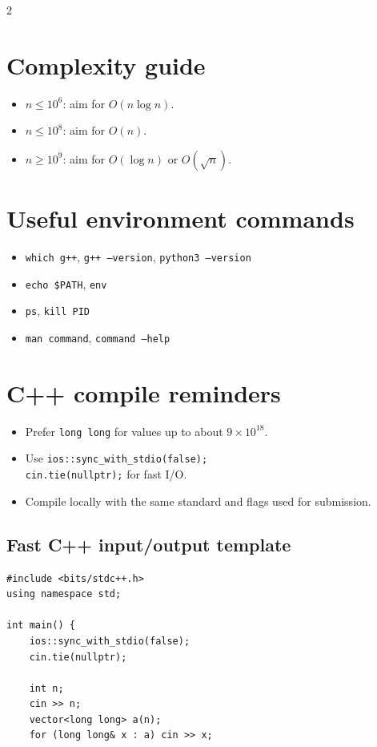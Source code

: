 \documentclass[10pt]{article}
\newcommand{\cmd}[1]{\texttt{\small #1}}
\newcommand{\code}[1]{\texttt{#1}}
\begin{document}
\begin{multicols}{2}
\section{Complexity guide}
\begin{itemize}
  \item $n \le 10^6$: aim for $O(n\log n)$.
  \item $n \le 10^8$: aim for $O(n)$.
  \item $n \ge 10^9$: aim for $O(\log n)$ or $O(\sqrt n)$.
\end{itemize}

\section{Useful environment commands}
\begin{itemize}
  \item \cmd{which g++}, \cmd{g++ --version}, \cmd{python3 --version}
  \item \cmd{echo \$PATH}, \cmd{env}
  \item \cmd{ps}, \cmd{kill PID}
  \item \cmd{man command}, \cmd{command --help}
\end{itemize}

\section{C++ compile reminders}
\begin{itemize}
  \item Prefer \code{long long} for values up to about $9\times10^{18}$.
  \item Use \code{ios::sync\_with\_stdio(false);}\\
        \code{cin.tie(nullptr);} for fast I/O.
  \item Compile locally with the same standard and flags used for submission.
\end{itemize}

\subsection{Fast C++ input/output template}
\begin{framed}
\scriptsize
\begin{verbatim}
#include <bits/stdc++.h>
using namespace std;

int main() {
    ios::sync_with_stdio(false);
    cin.tie(nullptr);

    int n;
    cin >> n;
    vector<long long> a(n);
    for (long long& x : a) cin >> x;


\end{verbatim}
\end{framed}
\end{multicols}
\end{document}
